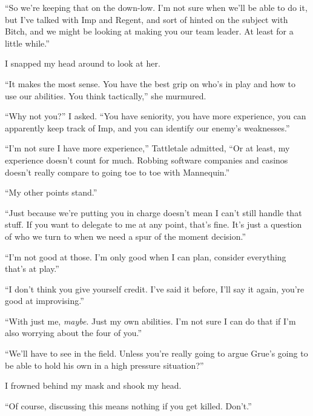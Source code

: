``So we're keeping that on the down-low.  I'm not sure when we'll be able to do it, but I've talked with Imp and Regent, and sort of hinted on the subject with Bitch, and we might be looking at making you our team leader.  At least for a little while.''



I snapped my head around to look at her.



``It makes the most sense.  You have the best grip on who's in play and how to use our abilities.  You think tactically,'' she murmured.



``Why not you?''  I asked.  ``You have seniority, you have more experience, you can apparently keep track of Imp, and you can identify our enemy's weaknesses.''



``I'm not sure I have more experience,'' Tattletale admitted, ``Or at least, my experience doesn't count for much.  Robbing software companies and casinos doesn't really compare to going toe to toe with Mannequin.''



``My other points stand.''



``Just because we're putting you in charge doesn't mean I can't still handle that stuff.  If you want to delegate to me at any point, that's fine.  It's just a question of who we turn to when we need a spur of the moment decision.''



``I'm not good at those.  I'm only good when I can plan, consider everything that's at play.''



``I don't think you give yourself credit.  I've said it before, I'll say it again, you're good at improvising.''



``With just me, \emph{maybe}.  Just my own abilities.  I'm not sure I can do that if I'm also worrying about the four of you.''



``We'll have to see in the field.  Unless you're really going to argue Grue's going to be able to hold his own in a high pressure situation?''



I frowned behind my mask and shook my head.



``Of course, discussing this means nothing if you get killed.  Don't.''



